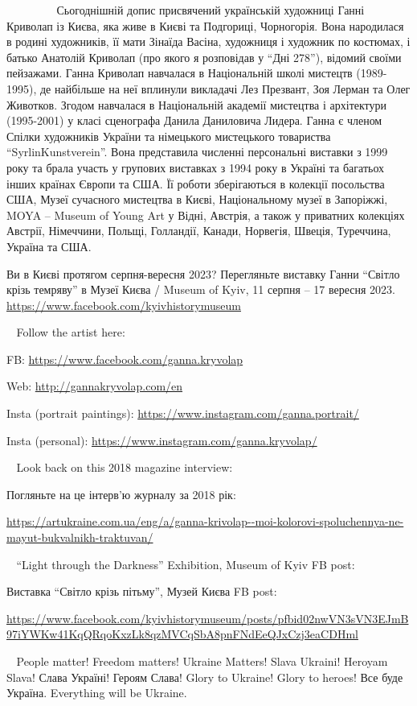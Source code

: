 💙💛 💙💛 💙💛 💙💛 💙💛
Сьогоднішній допис присвячений українській художниці Ганні Криволап із Києва,
яка живе в Києві та Подгориці, Чорногорія. Вона народилася в родині художників,
її мати Зінаїда Васіна, художниця і художник по костюмах, і батько Анатолій
Криволап (про якого я розповідав у \enquote{Дні 278}), відомий своїми пейзажами. Ганна
Криволап навчалася в Національній школі мистецтв (1989-1995), де найбільше на
неї вплинули викладачі Лез Презвант, Зоя Лерман та Олег Животков. Згодом
навчалася в Національній академії мистецтва і архітектури (1995-2001) у класі
сценографа Данила Даниловича Лидера. Ганна є членом Спілки художників України
та німецького мистецького товариства \enquote{SyrlinKunstverein}. Вона представила
численні персональні виставки з 1999 року та брала участь у групових виставках
з 1994 року в Україні та багатьох інших країнах Європи та США. Її роботи
зберігаються в колекції посольства США, Музеї сучасного мистецтва в Києві,
Національному музеї в Запоріжжі, MOYA – Museum of Young Art у Відні, Австрія, а
також у приватних колекціях Австрії, Німеччини, Польщі, Голландії, Канади,
Норвегія, Швеція, Туреччина, Україна та США.

Ви в Києві протягом серпня-вересня 2023? Перегляньте виставку Ганни \enquote{Світло
крізь темряву} в Музеї Києва / Museum of Kyiv, 11 серпня – 17 вересня 2023.
\url{https://www.facebook.com/kyivhistorymuseum} 

💙💛 Follow the artist here:\par
FB: \url{https://www.facebook.com/ganna.kryvolap} \par
Web: \url{http://gannakryvolap.com/en} \par
Insta (portrait paintings): \url{https://www.instagram.com/ganna.portrait/} \par
Insta (personal): \url{https://www.instagram.com/ganna.kryvolap/} \par

💙💛 Look back on this 2018 magazine interview: 

Погляньте на це інтерв'ю журналу за 2018 рік: 

\url{https://artukraine.com.ua/eng/a/ganna-krivolap--moi-kolorovi-spoluchennya-ne-mayut-bukvalnikh-traktuvan/}

💙💛 \enquote{Light through the Darkness} Exhibition, Museum of Kyiv FB post: 

Виставка \enquote{Світло крізь пітьму}, Музей Києва FB post: 

\url{https://www.facebook.com/kyivhistorymuseum/posts/pfbid02nwVN3sVN3EJmB97iYWKw41KqQRqoKxzLk8qzMVCqSbA8pnFNdEeQJxCzj3eaCDHml} 

💙💛 People matter! Freedom matters! Ukraine Matters! Slava Ukraini! Heroyam
Slava! Слава Україні! Героям Слава! Glory to Ukraine! Glory to heroes! Все буде
Україна. Everything will be Ukraine.
